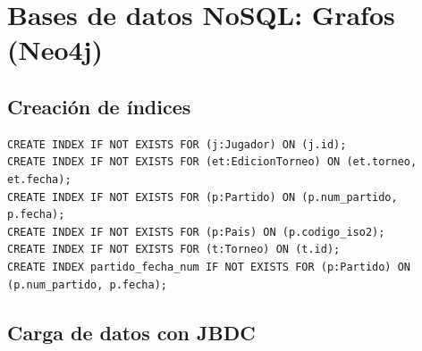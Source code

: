 \documentclass[11pt]{opticajnl}
\begin{document}
\section{Bases de datos NoSQL: Grafos (Neo4j)}

\subsection{Creación de índices}

\begin{lstlisting}[language=Cypher]
CREATE INDEX IF NOT EXISTS FOR (j:Jugador) ON (j.id);
CREATE INDEX IF NOT EXISTS FOR (et:EdicionTorneo) ON (et.torneo, et.fecha);
CREATE INDEX IF NOT EXISTS FOR (p:Partido) ON (p.num_partido, p.fecha);
CREATE INDEX IF NOT EXISTS FOR (p:Pais) ON (p.codigo_iso2);
CREATE INDEX IF NOT EXISTS FOR (t:Torneo) ON (t.id);
CREATE INDEX partido_fecha_num IF NOT EXISTS FOR (p:Partido) ON (p.num_partido, p.fecha);
\end{lstlisting}

\subsection{Carga de datos con JBDC}
\end{document}
